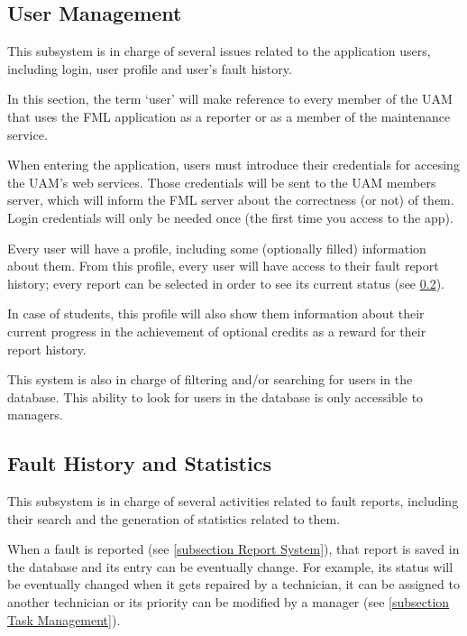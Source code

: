\subsection{User Management}
\label{subsection User Management}

This subsystem is in charge of several issues related to the application users, including login, user profile and user's fault history.

In this section, the term `user' will make reference to every member of the UAM that uses the FML application as a reporter or as a member of the maintenance service.

When entering the application, users must introduce their credentials for accesing the UAM's web services. Those credentials will be sent to the UAM members server, which will inform the FML server about the correctness (or not) of them. Login credentials will only be needed once (the first time you access to the app).

Every user will have a profile, including some (optionally filled) information about them. From this profile, every user will have access to their fault report history; every report can be selected in order to see its current status (see \ref{subsection Fault History and Statistics}).

In case of students, this profile will also show them information about their current progress in the achievement of optional credits as a reward for their report history.

This system is also in charge of filtering and/or searching for users in the database. This ability to look for users in the database is only accessible to managers.

\subsection{Fault History and Statistics}
\label{subsection Fault History and Statistics}

This subsystem is in charge of several activities related to fault reports, including their search and the generation of statistics related to them.

When a fault is reported (see \ref{subsection Report System}), that report is saved in the database and its entry can be eventually change. For example, its status will be eventually changed when it gets repaired by a technician, it can be assigned to another technician or its priority can be modified by a manager (see \ref{subsection Task Management}).


